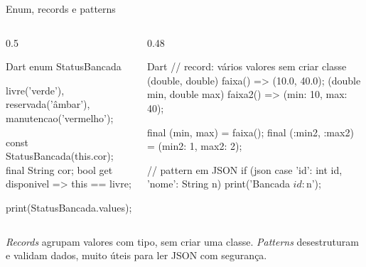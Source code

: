 \documentclass[aspectratio=169,10pt]{beamer}
\begin{document}
\begin{frame}[fragile]{Enum, records e patterns}
  \begin{columns}[T]
    \begin{column}{0.5\textwidth}
\begin{codigo}[title=Enum aprimorado]{Dart}
enum StatusBancada {
  livre('verde'),
  reservada('âmbar'),
  manutencao('vermelho');

  const StatusBancada(this.cor);
  final String cor;
  bool get disponivel => this == livre;
}

print(StatusBancada.values);
\end{codigo}
    \end{column}
    \begin{column}{0.48\textwidth}
\begin{codigo}[title=Records e desestruturação]{Dart}
// record: vários valores sem criar classe
(double, double) faixa() => (10.0, 40.0);
({double min, double max}) faixa2() =>
    (min: 10, max: 40);

final (min, max) = faixa();
final (:min2, :max2) = (min2: 1, max2: 2);

// pattern em JSON
if (json case {'id': int id, 'nome': String n}) {
  print('Bancada $id: $n');
}
\end{codigo}
    \end{column}
  \end{columns}
  \begin{conceito}
    \emph{Records} agrupam valores com tipo, sem criar uma classe. \emph{Patterns} desestruturam e validam dados, muito úteis para ler JSON com segurança.
  \end{conceito}
\end{frame}
\end{document}
